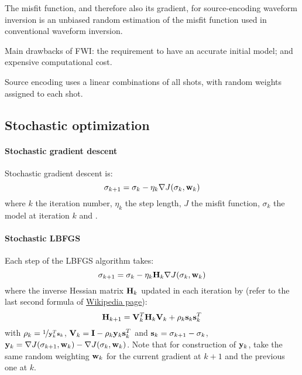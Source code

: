 The misfit function, and therefore also its gradient, for source-encoding waveform inversion
is an unbiased random estimation of the misfit function used in conventional waveform inversion.

Main drawbacks of FWI: the requirement to have an accurate initial model;
and expensive computational cost.

Source encoding uses a linear combinations of all shots, with random weights assigned to each shot.

\subsection{Stochastic optimization}
\paragraph{Stochastic gradient descent}
Stochastic gradient descent is:
\[ \sigma_{k+1}=\sigma_k-\eta_k\nabla J(\sigma_k,\mathbf{w}_k) \]
where $k$ the iteration number, $\eta_k$ the step length, $J$ the misfit function,
$\sigma_k$ the model at iteration $k$ and .

\paragraph{Stochastic LBFGS}
Each step of the LBFGS algorithm takes:
\[ \sigma_{k+1}=\sigma_k-\eta_k\mathbf{H}_k\nabla J(\sigma_k,\mathbf{w}_k) \]
where the inverse Hessian matrix $\mathbf{H}_k$ updated in each iteration
by (refer to the last second formula of
\href{https://en.wikipedia.org/wiki/Broyden-Fletcher-Goldfarb-Shanno_algorithm}{Wikipedia page}):
\[ \mathbf{H}_{k+1}=\mathbf{V}_k^T\mathbf{H}_k\mathbf{V}_k+\rho_k\mathbf{s}_k\mathbf{s}_k^T \]
with $\rho_k=\nicefrac{1}{\mathbf{y}_k^T\mathbf{s}_k}$, $\mathbf{V}_k=\mathbf{I}-\rho_k\mathbf{y}_k\mathbf{s}_k^T$
and $\mathbf{s}_k=\sigma_{k+1}-\sigma_k$,
$\mathbf{y}_k=\nabla J(\sigma_{k+1},\mathbf{w}_k)-\nabla J(\sigma_k,\mathbf{w}_k)$.
Note that for construction of $\mathbf{y}_k$, take the same random weighting $\mathbf{w}_k$
for the current gradient at $k+1$ and the previous one at $k$.

